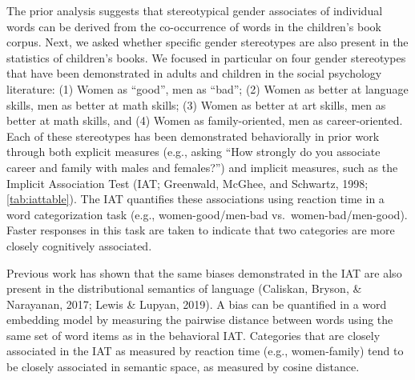 \documentclass[
  english,
  ,man,floatsintext]{apa6}
\begin{document}
The prior analysis suggests that stereotypical gender associates of individual words can be derived from the co-occurrence of words in the children's book corpus. Next, we asked whether specific gender stereotypes are also present in the statistics of children's books. We focused in particular on four gender stereotypes that have been demonstrated in adults and children in the social psychology literature: (1) Women as \enquote{good}, men as \enquote{bad}; (2) Women as better at language skills, men as better at math skills; (3) Women as better at art skills, men as better at math skills, and (4) Women as family-oriented, men as career-oriented. Each of these stereotypes has been demonstrated behaviorally in prior work through both explicit measures (e.g., asking \enquote{How strongly do you associate career and family with males and females?}) and implicit measures, such as the Implicit Association Test (IAT; Greenwald, McGhee, and Schwartz, 1998; \autoref{tab:iattable}). The IAT quantifies these associations using reaction time in a word categorization task (e.g., women-good/men-bad vs.~women-bad/men-good). Faster responses in this task are taken to indicate that two categories are more closely cognitively associated.

Previous work has shown that the same biases demonstrated in the IAT are also present in the distributional semantics of language (Caliskan, Bryson, \& Narayanan, 2017; Lewis \& Lupyan, 2019). A bias can be quantified in a word embedding model by measuring the pairwise distance between words using the same set of word items as in the behavioral IAT. Categories that are closely associated in the IAT as measured by reaction time (e.g., women-family) tend to be closely associated in semantic space, as measured by cosine distance.

\begingroup\fontsize{9}{11}\selectfont
\end{document}
